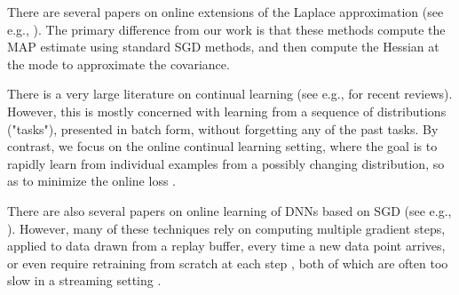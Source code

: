 There are  several papers on online extensions of the Laplace approximation
(see e.g., \citep{Ritter2018online,Daxberger2021laplace}).
The primary difference from our work is that these methods compute the MAP estimate using standard SGD methods, and then compute the Hessian at the mode
 to approximate the covariance.


 There is a very large literature on continual learning
 (see e.g., \citep{Wang2023CL,Mai2022,Delange2021,Mundt2023} for recent reviews).
 However, this is mostly concerned with learning from a sequence of distributions ("tasks"),
 presented in batch form,
 without forgetting any of the past tasks.
 By contrast, we focus on the online continual learning setting,
 where the goal is to rapidly
 learn from  individual examples from a possibly
 changing distribution, so as to
minimize the online loss \citep{Cai2021,Ghunaim2023,Dawid99,Gama2013}.
 
 There are also several papers on online learning of DNNs based on SGD
 (see e.g., \citep{Hu2021onepass,Ash2020,Dohare2021,Xu2021}).
However, many of these techniques 
 rely on computing multiple gradient steps,
 applied to data drawn from  a replay buffer,
 every time a new data point arrives,
 or even require retraining from scratch
 at each step
 \citep{Paria2022},
 both of which are often too slow in a streaming setting
\citep{Ghunaim2023}.

 

 
